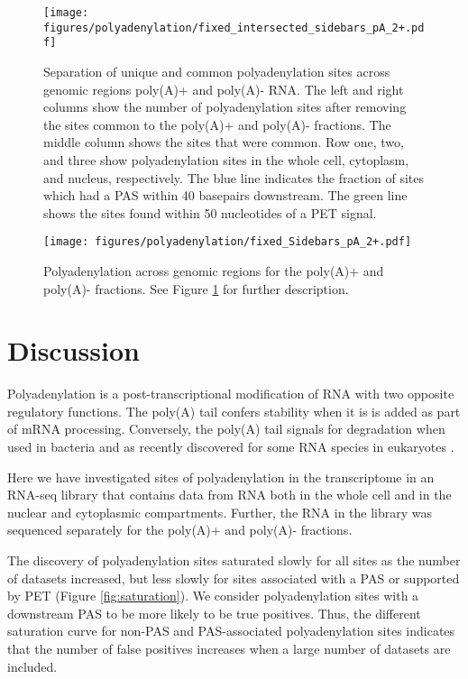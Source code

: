 \begin{figure}[hb]
	\begin{center}
		\texttt{[image: figures/polyadenylation/fixed\_intersected\_sidebars\_pA\_2+.pdf]}
	\end{center}
    \caption{Separation of unique and common polyadenylation sites across
    genomic regions poly(A)+ and poly(A)- RNA. The left and right columns show
    the number of polyadenylation sites after removing the sites common to
	the poly(A)+ and poly(A)- fractions. The middle column shows the sites that
	were common. Row one, two, and three show polyadenylation sites in the whole
	cell, cytoplasm, and nucleus, respectively. The blue line indicates the
	fraction of sites which had a PAS within 40 basepairs downstream. The green
	line shows the sites found within 50 nucleotides of a PET signal.}
	\label{fig:sidebars_intersect}
\end{figure}

\begin{figure}[hb]
	\begin{center}
		\texttt{[image: figures/polyadenylation/fixed\_Sidebars\_pA\_2+.pdf]}
	\end{center}
	\caption{Polyadenylation across genomic regions for the poly(A)+ and poly(A)-
	fractions. See Figure \ref{fig:sidebars_intersect} for further description.}
	\label{fig:sidebars}
\end{figure}

\section{Discussion}
Polyadenylation is a post-transcriptional modification of RNA with two opposite
regulatory functions. The poly(A) tail confers stability when it is is added as
part of mRNA processing. Conversely, the poly(A) tail signals for degradation
when used in bacteria and as recently discovered for some RNA species in
eukaryotes \cite{shcherbik_polyadenylation_2010}.

Here we have investigated sites of polyadenylation in the transcriptome in an
RNA-seq library that contains data from RNA both in the whole cell and in the
nuclear and cytoplasmic compartments. Further, the RNA in the library was
sequenced separately for the poly(A)+ and poly(A)- fractions.

The discovery of polyadenylation sites saturated slowly for all sites as the
number of datasets increased, but less slowly for sites associated with a PAS
or supported by PET (Figure \ref{fig:saturation}). We consider polyadenylation
sites with a downstream PAS to be more likely to be true positives. Thus, the
different saturation curve for non-PAS and PAS-associated polyadenylation sites
indicates that the number of false positives increases when a large number of
datasets are included.

